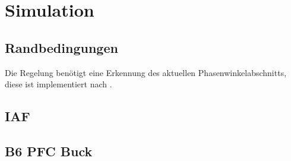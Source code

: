 \chapter{Simulation}

\section{Randbedingungen}

Die Regelung benötigt eine Erkennung des aktuellen Phasenwinkelabschnitts, diese ist implementiert nach \cite{InstituteofElectricalandElectronicsEngineers.2007}.

\section{IAF}

\cite{IAF99}


\section{B6 PFC Buck}